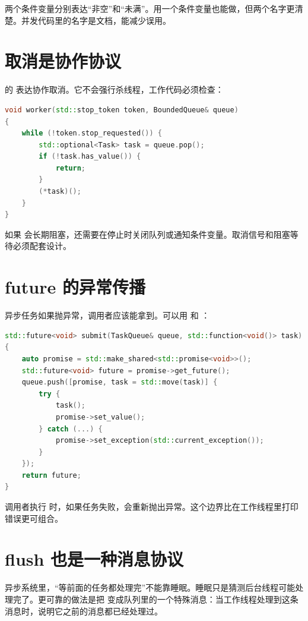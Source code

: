 两个条件变量分别表达“非空”和“未满”。用一个条件变量也能做，但两个名字更清楚。并发代码里的名字是文档，能减少误用。

\section{取消是协作协议}

 的  表达协作取消。它不会强行杀线程，工作代码必须检查：

\begin{lstlisting}[language=C++,caption={检查停止请求}]
void worker(std::stop_token token, BoundedQueue& queue)
{
    while (!token.stop_requested()) {
        std::optional<Task> task = queue.pop();
        if (!task.has_value()) {
            return;
        }
        (*task)();
    }
}
\end{lstlisting}

如果  会长期阻塞，还需要在停止时关闭队列或通知条件变量。取消信号和阻塞等待必须配套设计。

\section{future 的异常传播}

异步任务如果抛异常，调用者应该能拿到。可以用  和 ：

\begin{lstlisting}[language=C++,caption={用 promise 传递异常}]
std::future<void> submit(TaskQueue& queue, std::function<void()> task)
{
    auto promise = std::make_shared<std::promise<void>>();
    std::future<void> future = promise->get_future();
    queue.push([promise, task = std::move(task)] {
        try {
            task();
            promise->set_value();
        } catch (...) {
            promise->set_exception(std::current_exception());
        }
    });
    return future;
}
\end{lstlisting}

调用者执行  时，如果任务失败，会重新抛出异常。这个边界比在工作线程里打印错误更可组合。

\section{flush 也是一种消息协议}

异步系统里，“等前面的任务都处理完”不能靠睡眠。睡眠只是猜测后台线程可能处理完了。更可靠的做法是把  变成队列里的一个特殊消息：当工作线程处理到这条消息时，说明它之前的消息都已经处理过。

